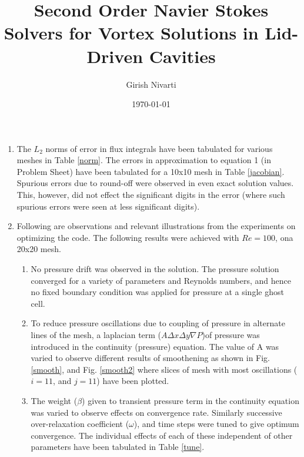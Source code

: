 \documentclass[a4paper, 10pt]{article}
\title{Second Order Navier Stokes Solvers for Vortex Solutions in Lid-Driven Cavities}
\author{Girish Nivarti}
\date{\today}
\begin{document}
\maketitle
\begin{enumerate}[I]

\item The $L_2$ norms of error in flux integrals have been tabulated for various meshes in Table \ref{norm}. The errors in approximation to equation 1 (in Problem Sheet) have been tabulated for a 10x10 mesh in Table \ref{jacobian}. Spurious errors due to round-off were observed in even exact solution values. This, however, did not effect the significant digits in the error (where such spurious errors were seen at less significant digits).



\item Following are observations and relevant illustrations from the experiments on optimizing the code. The following results were achieved with $Re = 100$, ona  20x20 mesh.
  \begin{enumerate} [a]
  \item No pressure drift was observed in the solution. The pressure solution converged for a variety of parameters and Reynolds numbers, and hence no fixed boundary condition was applied for pressure at a single ghost cell. 
    \item To reduce pressure oscillations due to coupling of pressure in alternate lines of the mesh, a laplacian term ($A\Delta x \Delta y \nabla P$)of pressure was introduced in the continuity (pressure) equation.  The value of A was varied to observe different results of smoothening as shown in Fig. \ref{smooth}, and Fig. \ref{smooth2} where slices of mesh with most oscillations ($i = 11$, and $j = 11$) have been plotted. 
    \item The weight ($\beta$) given to transient pressure term in the continuity equation was varied to observe effects on convergence rate. Similarly successive over-relaxation coefficient ($\omega$), and time steps were tuned to give optimum convergence. The individual effects of each of these independent of other parameters have been tabulated in Table \ref{tune}.


\end{enumerate}
\end{enumerate}
\end{document}
